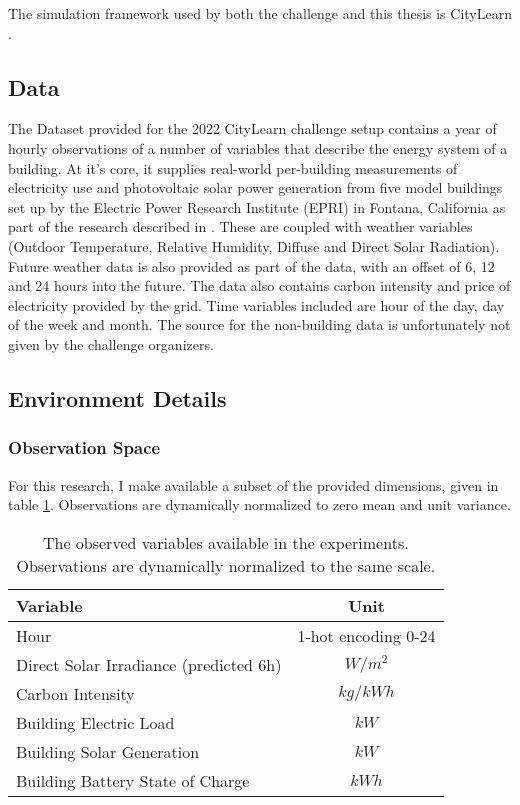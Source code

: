 The simulation framework used by both the challenge and this thesis is CityLearn \cite{vazquez-canteli2019CityLearnV1OpenAI}.

\subsection{Data}
The Dataset provided for the 2022 CityLearn challenge setup contains a year of hourly observations of a number of variables that describe the energy system of a building.
At it's core, it supplies real-world per-building measurements of electricity use and photovoltaic solar power generation from five model buildings set up by the Electric Power Research Institute (EPRI) in Fontana, California as part of the research described in \cite{narayanamurthyGridIntegrationZero}.
These are coupled with weather variables (Outdoor Temperature, Relative Humidity, Diffuse and Direct Solar Radiation).
Future weather data is also provided as part of the data, with an offset of 6, 12 and 24 hours into the future.
The data also contains carbon intensity and price of electricity provided by the grid.
Time variables included are hour of the day, day of the week and month.
The source for the non-building data is unfortunately not given by the challenge organizers.

\subsection{Environment Details}
\subsubsection{Observation Space}
For this research, I make available a subset of the provided dimensions, given in table \ref{tab:observations}. Observations are dynamically normalized to zero mean and unit variance.

\begin{table}[h]
    \caption{The observed variables available in the experiments. Observations are dynamically normalized to the same scale.} \label{tab:observations}
    \centering
    \begin{tabular}{l|c}
        Variable & Unit \\ \hline
        Hour & 1-hot encoding 0-24 \\
        Direct Solar Irradiance (predicted 6h) & $W/m^2$ \\
        Carbon Intensity & $kg/kWh$ \\
        Building Electric Load & $kW$\\
        Building Solar Generation & $kW$\\
        Building Battery State of Charge & $kWh$\\
    \end{tabular}
\end{table}

